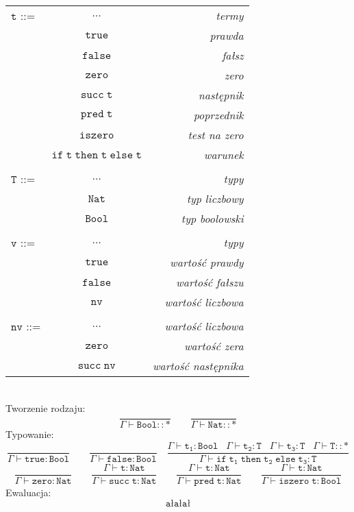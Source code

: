 \documentclass[11pt,leqno]{article}
\begin{document}
\begin{tabular}{| l c r |}
  \hline
  $\mathtt{t}$ ::= & $\dots$ & \textit{termy}  \\
   & $\mathtt{true}$ & \textit{prawda}  \\
   & $\mathtt{false}$ & \textit{fałsz} \\
   & $\mathtt{zero}$ & \textit{zero} \\
   & $\mathtt{succ\;t}$ & \textit{następnik}  \\
   & $\mathtt{pred\;t}$ & \textit{poprzednik} \\
   & $\mathtt{iszero}$ & \textit{test na zero} \\
   & $\mathtt{if\;t\;then\;t\;else\;t}$ & \textit{warunek} \\
   & & \\
  $\mathtt{T}$ ::= & $\dots$ & \textit{typy} \\
   & $\mathtt{Nat}$ & \textit{typ liczbowy} \\
   & $\mathtt{Bool}$ & \textit{typ boolowski} \\
   & & \\
  $\mathtt{v}$ ::= & $\dots$ & \textit{typy} \\
   & $\mathtt{true}$ & \textit{wartość prawdy} \\
   & $\mathtt{false}$ & \textit{wartość fałszu} \\
   & $\mathtt{nv}$ & \textit{wartość liczbowa} \\
   & & \\
  $\mathtt{nv}$ ::= & $\dots$ & \textit{wartość liczbowa} \\
   & $\mathtt{zero}$ & \textit{wartość zera} \\
   & $\mathtt{succ\;nv}$ & \textit{wartość następnika} \\
  \hline
\end{tabular} \\

Tworzenie rodzaju:
 	\[\mathtt{ \frac{}{\Gamma \vdash Bool::\ast} \qquad \frac{}{\Gamma \vdash Nat::\ast}
		}
	\]
Typowanie:
 	\[\mathtt{ \frac{}{\Gamma \vdash true:Bool} \qquad \frac{}{\Gamma \vdash false:Bool} \quad \frac{\Gamma \vdash t_1:Bool \;\;\; \Gamma \vdash t_2:T \;\;\; \Gamma \vdash t_3:T \;\;\; \Gamma \vdash T::\ast}{\Gamma \vdash if\;t_1\;then\;t_2\;else\;t_3:T}
		}
	\]
 	\[\mathtt{ \frac{}{\Gamma \vdash zero:Nat} \qquad \frac{\Gamma \vdash t:Nat}{\Gamma \vdash succ\;t:Nat} \qquad \frac{\Gamma \vdash t:Nat}{\Gamma \vdash pred\;t:Nat} \qquad \frac{\Gamma \vdash t:Nat}{\Gamma \vdash iszero\;t:Bool}
		}
	\]
Ewaluacja:
 	\[\mathtt{ ał ał ał
		}
	\]
\end{document}
